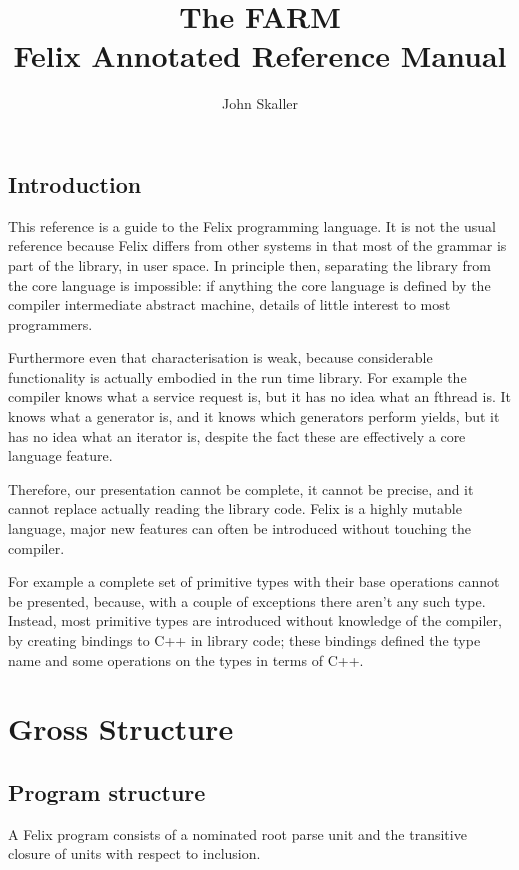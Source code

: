 \documentclass[oneside]{book}
\title{The FARM\\ Felix Annotated Reference Manual}
\author{John Skaller}
\begin{document}
\maketitle
\tableofcontents
\chapter{Introduction}
This reference is a guide to the Felix programming language.
It is not the usual reference because Felix differs from
other systems in that most of the grammar is part of the library,
in user space. In principle then, separating the library from the 
core language is impossible: if anything the core language is
defined by the compiler intermediate abstract machine, details
of little interest to most programmers.

Furthermore even that characterisation is weak, because considerable
functionality is actually embodied in the run time library. For example
the compiler knows what a service request is, but it has no idea
what an fthread is. It knows what a generator is, and it knows which
generators perform yields, but it has no idea what an iterator is,
despite the fact these are effectively a core language feature.

Therefore, our presentation cannot be complete, it cannot be precise,
and it cannot replace actually reading the library code. Felix is a highly
mutable language, major new features can often be introduced without
touching the compiler.

For example a complete set of primitive types with their base
operations cannot be presented, because, with a couple of exceptions
there aren't any such type. Instead, most primitive types are introduced
without knowledge of the compiler, by creating bindings to C++ in 
library code; these bindings defined the type name and some operations
on the types in terms of C++.


\part{Gross Structure}

\chapter{Program structure}
A Felix program consists of a nominated root parse unit and
the transitive closure of units with respect to inclusion.
\end{document}

